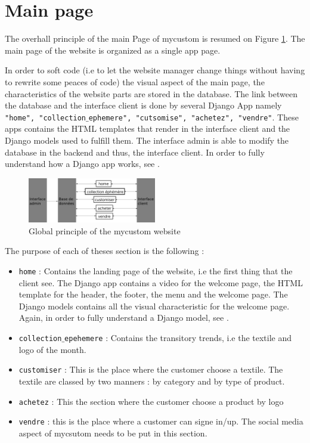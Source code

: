 \section{Main page}

The overhall principle of the main Page of mycustom is resumed on Figure \ref{fig:principe}. The main page of the website is organized as a single app page. 

In order to soft code (i.e to let the website manager change things without having to rewrite some peaces of code) the visual aspect of the main page, the characteristics of the website parts are stored in the database. The link between the database and the interface client is done by several Django App namely \texttt{"home", "collection$\_$ephemere", "cutsomise", "achetez", "vendre"}. These apps contains the HTML templates that render in the interface client and the Django models used to fulfill them. The interface admin is able to modify the database in the backend and thus, the interface client. In order to fully understand how a Django app works, see \cite{Django, Django_doc}. 

\begin{figure}[!ht]
	\centering
	\includegraphics[width=0.5\textwidth]{overview/principe}
	\caption{Global principle of the mycustom website}
	\label{fig:principe}
\end{figure}

The purpose of each of theses section is the following : 

\begin{itemize}
	\item \texttt{home} : Contains the landing page of the website, i.e the first thing that the client see. The Django app contains a video for the welcome page, the HTML template for the header, the footer, the menu and the welcome page. The Django models contains all the visual characteristic for the welcome page. Again, in order to fully understand a Django model, see \cite{Django, Django_doc}.
	\item \texttt{collection$\_$epehemere} : Contains the transitory trends, i.e  the textile and logo of the month. 
	\item \texttt{customiser} : This is the place where the customer choose a textile. The textile are classed by two manners : by category and by type of product. 
	\item \texttt{achetez} : This the section where the customer choose a product by logo
	\item \texttt{vendre} : this is the place where a customer can signe in/up. The social media aspect of mycsutom needs to be put in this section. 
\end{itemize}

